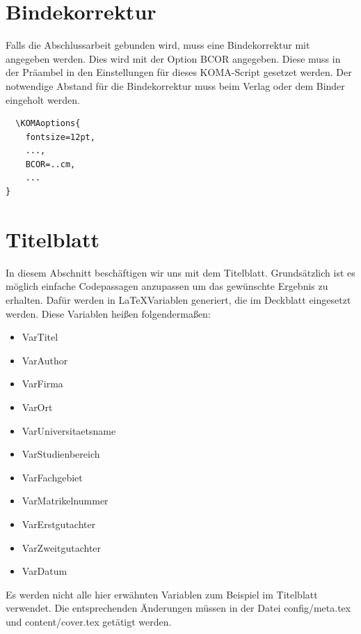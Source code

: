 		
	\section{Bindekorrektur}
		\label{sec:bindekorrektur}
		Falls die Abschlussarbeit gebunden wird, muss eine Bindekorrektur mit angegeben werden. Dies wird mit der Option BCOR angegeben. Diese muss in der Präambel in den Einstellungen für dieses KOMA-Script gesetzet werden. Der notwendige Abstand für die Bindekorrektur muss beim Verlag oder dem Binder eingeholt werden.
		
\begin{lstlisting}[style=texlisting, caption={Bindekorrektur angeben}, label={lst:bindekorrektur}]
% KOMA Options
  \KOMAoptions{
    fontsize=12pt,
    ...,
    BCOR=..cm,
    ...
}
\end{lstlisting}
	
	\section{Titelblatt}
		\label{sec:titelblatt}
		In diesem Abschnitt beschäftigen wir uns mit dem Titelblatt. Grundsätzlich ist es möglich einfache Codepassagen anzupassen um das gewünschte Ergebnis zu erhalten. 
		Dafür werden in \LaTeX Variablen generiert, die im Deckblatt eingesetzt werden.
		Diese Variablen heißen folgendermaßen:
		\begin{itemize}[noitemsep]
			\item VarTitel
			\item VarAuthor
			\item VarFirma
			\item VarOrt
			\item VarUniversitaetsname
			\item VarStudienbereich
			\item VarFachgebiet
			\item VarMatrikelnummer
			\item VarErstgutachter
			\item VarZweitgutachter
			\item VarDatum
		\end{itemize}
		Es werden nicht alle hier erwähnten Variablen zum Beispiel im Titelblatt verwendet. Die entsprechenden Änderungen müssen in der Datei config/meta.tex und content/cover.tex getätigt werden.

